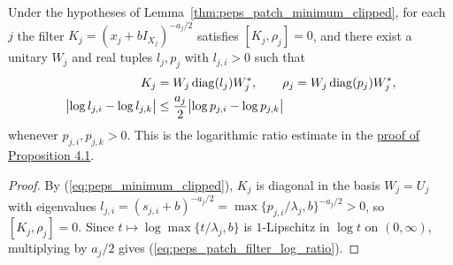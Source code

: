 \begin{lemma}
    \label{thm:peps_patch_minimum_filter_log_ratio}
    \leanok
    Under the hypotheses of Lemma~\ref{thm:peps_patch_minimum_clipped},
    for each $j$ the filter $K_j=(x_j+bI_{X_j})^{-a_j/2}$ satisfies $[K_j,\rho_j]=0$, and
    there exist a unitary $W_j$ and real tuples $l_j,p_j$ with $l_{j,i}>0$ such that
    \begin{align}
        K_j & =W_j\operatorname{diag}(l_j)W_j^*,\qquad
        \rho_j=W_j\operatorname{diag}(p_j)W_j^*, \notag           \\
        \bigl|\log l_{j,i}-\log l_{j,k}\bigr|
            & \le\frac{a_j}2\bigl|\log p_{j,i}-\log p_{j,k}\bigr|
        \label{eq:peps_patch_filter_log_ratio}
    \end{align}
    whenever $p_{j,i},p_{j,k}>0$. This is the logarithmic ratio estimate in the
    \href{https://github.com/openai/math/blob/adc7f1241b42e322a6451854ab7e4b4c146bf78a/preprints/Polynomial-PEPS-approximation-of-gapped-square-grid-ground-states-September-24-2026/build/sections/03-patches.tex\#L201-L212}{proof of Proposition 4.1}.
\end{lemma}
\begin{proof}
    \leanok
    By (\ref{eq:peps_minimum_clipped}), $K_j$ is diagonal in the basis $W_j=U_j$ with eigenvalues
    $l_{j,i}=(s_{j,i}+b)^{-a_j/2}=\max\{p_{j,i}/\lambda_j,b\}^{-a_j/2}>0$, so $[K_j,\rho_j]=0$. Since $t\mapsto\log\max\{t/\lambda_j,b\}$ is $1$-Lipschitz in $\log t$ on $(0,\infty)$, multiplying by $a_j/2$ gives (\ref{eq:peps_patch_filter_log_ratio}).
\end{proof}

